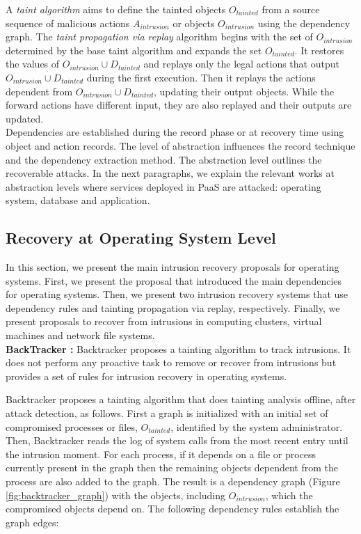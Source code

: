 A \textit{taint algorithm} aims to define the tainted objects $O_{tainted}$ from a source sequence of malicious actions $A_{intrusion}$ or objects $O_{intrusion}$ using the dependency graph. The \textit{taint propagation via replay} \cite{retro} algorithm begins with the set of $O_{intrusion}$ determined by the base taint algorithm and expands the set $O_{tainted}$. It restores the values of $O_{intrusion} \cup D_{tainted}$ and replays only the legal actions that output $O_{intrusion} \cup D_{tainted}$ during the first execution. Then it replays the actions dependent from $O_{intrusion} \cup D_{tainted}$, updating their output objects. While the forward actions have different input, they are also replayed and their outputs are updated.\\

Dependencies are established during the record phase or at recovery time using object and action records. The level of abstraction influences the record technique and the dependency extraction method. The abstraction level outlines the recoverable attacks. In the next paragraphs, we explain the relevant works at abstraction levels where services deployed in \ac{PaaS} are attacked: operating system, database and application.\\


\subsection{Recovery at Operating System Level}
\label{sec:related:recovery_os}

In this section, we present the main intrusion recovery proposals for operating systems. First, we present the proposal that introduced the main dependencies for operating systems. Then, we present two intrusion recovery systems that use dependency rules and tainting propagation via replay, respectively. Finally, we present proposals to recover from intrusions in computing clusters, virtual machines and network file systems.\\

\textbf{BackTracker \cite{backtracker}:} Backtracker proposes a tainting algorithm to track intrusions. It does not perform any proactive task to remove or recover from intrusions but provides a set of rules for intrusion recovery in operating systems.

Backtracker proposes a tainting algorithm that does tainting analysis offline, after attack detection, as follows. First a graph is initialized with an initial set of compromised processes or files, $O_{tainted}$, identified by the system administrator. Then, Backtracker reads the log of system calls from the most recent entry until the intrusion moment. For each process, if it depends on a file or process currently present in the graph then the remaining objects dependent from the process are also added to the graph. The result is a dependency graph (Figure \ref{fig:backtracker_graph}) with the objects, including $O_{intrusion}$, which the compromised objects depend on. The following dependency rules establish the graph edges:

